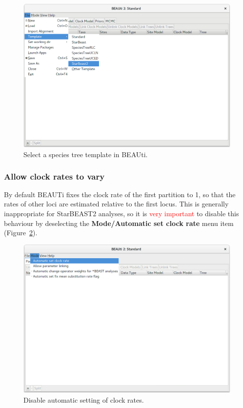 \documentclass{article}
\begin{document}
\begin{figure}[htb!]
\centering
\includegraphics[width=\textwidth]{figures/beauti-strict.png}
\caption{Select a species tree template in BEAUti.}
\label{fig:sb2Template}
\end{figure}

\clearpage

\subsubsection*{Allow clock rates to vary}

By default BEAUTi fixes the clock rate of the first partition to 1, so that
the rates of other loci are estimated relative to the first locus. This is
generally inappropriate for StarBEAST2 analyses, so it is \textcolor{red}{very
important} to disable this behaviour by deselecting the \textbf{Mode/Automatic
set clock rate} menu item (Figure~\ref{fig:disableAuto}).

\begin{figure}[htb!]
\centering
\includegraphics[width=\textwidth]{figures/beauti-disable.png}
\caption{Disable automatic setting of clock rates.}
\label{fig:disableAuto}
\end{figure}
\end{document}
